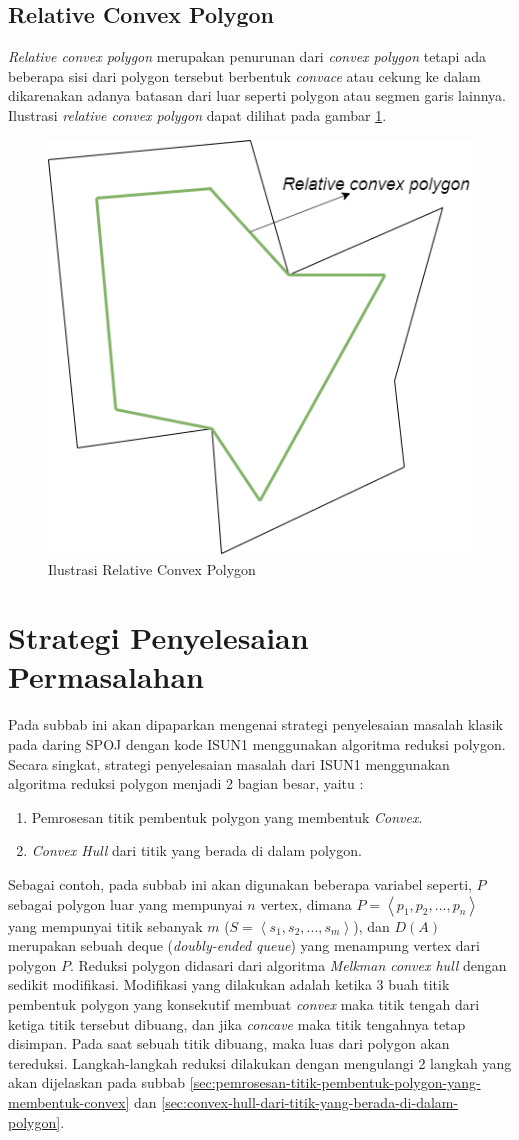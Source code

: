 \subsection{Relative Convex Polygon}
\textit{Relative convex polygon} merupakan penurunan dari \textit{convex polygon} tetapi ada beberapa sisi dari polygon tersebut berbentuk \textit{convace} atau cekung ke dalam dikarenakan adanya batasan dari luar seperti polygon atau segmen garis lainnya. Ilustrasi \textit{relative convex polygon} dapat dilihat pada gambar \ref{fig:ilustrasi-relative-convex-polygon}.
\begin{figure}[!h]
    \Centering
    \includegraphics[width=0.5\columnwidth]{bab2/img/ilustrasi-relative-convex-polygon}
    \caption{Ilustrasi Relative Convex Polygon}
    \label{fig:ilustrasi-relative-convex-polygon}
\end{figure}
\section{Strategi Penyelesaian Permasalahan}
Pada subbab ini akan dipaparkan mengenai strategi penyelesaian masalah klasik pada daring SPOJ dengan kode ISUN1 menggunakan algoritma reduksi polygon. Secara singkat, strategi penyelesaian masalah dari ISUN1 menggunakan algoritma reduksi polygon menjadi 2 bagian besar, yaitu :
\begin{enumerate}
    \item Pemrosesan titik pembentuk polygon yang membentuk \textit{Convex}.
    \item \textit{Convex Hull} dari titik yang berada di dalam polygon.
\end{enumerate}
Sebagai contoh, pada subbab ini akan digunakan beberapa variabel seperti, $P$ sebagai polygon luar yang mempunyai $n$ vertex, dimana $P = \left \langle p_1, p_2, ..., p_n \right \rangle$ yang mempunyai titik sebanyak $m$ ($S = \left \langle s_1, s_2, ..., s_m \right \rangle$), dan $D(A)$ merupakan sebuah deque (\textit{doubly-ended queue}) yang menampung vertex dari polygon $P$. Reduksi polygon didasari dari algoritma \textit{Melkman convex hull} dengan sedikit modifikasi. Modifikasi yang dilakukan adalah ketika 3 buah titik pembentuk polygon yang konsekutif membuat \textit{convex} maka titik tengah dari ketiga titik tersebut dibuang, dan jika \textit{concave} maka titik tengahnya tetap disimpan. Pada saat sebuah titik dibuang, maka luas dari polygon akan tereduksi. Langkah-langkah reduksi dilakukan dengan mengulangi 2 langkah yang akan dijelaskan pada subbab \ref{sec:pemrosesan-titik-pembentuk-polygon-yang-membentuk-convex} dan \ref{sec:convex-hull-dari-titik-yang-berada-di-dalam-polygon}.


